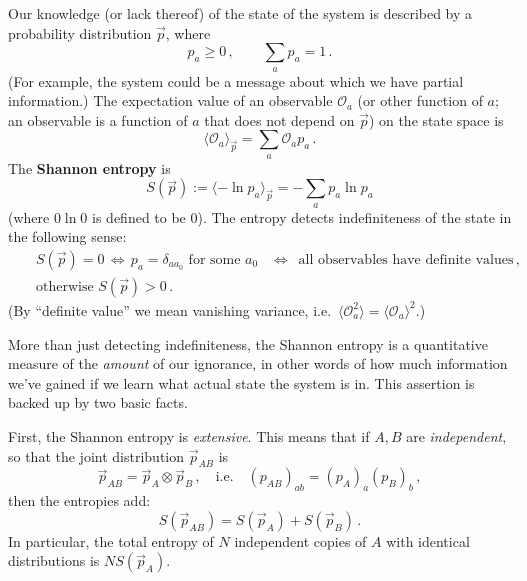 \documentclass[11pt]{article}
\newcommand{\ev}[1]{\langle{#1}\rangle}
\newcommand{\OO}{\mathcal{O}}
\begin{document}
Our knowledge (or lack thereof) of the state of the system is described by a probability distribution $\vec p$, where
\begin{equation}
p_a\ge0\,,\qquad\sum_ap_a = 1\,.
\end{equation}
(For example, the system could be a message about which we have partial information.) The expectation value of an observable $\OO_a$ (or other function of $a$; an observable is a function of $a$ that does not depend on $\vec p$) on the state space is
\begin{equation}
\ev{\OO_a}_{\vec p} = \sum_a\OO_ap_a\,.
\end{equation}
The \textbf{Shannon entropy} \cite{MR0026286} is
\begin{equation}
S(\vec p) := \ev{-\ln p_a}_{\vec p} = -\sum_ap_a\ln p_a
\end{equation}
(where $0\ln0$ is defined to be 0). The entropy detects indefiniteness of the state in the following sense:
\begin{eqnarray}\label{diagignorance}
&&S(\vec p) = 0 \,\Leftrightarrow\,p_a=\delta_{aa_0}\text{ for some $a_0$ }\,\Leftrightarrow\,\text{ all observables have definite values}\,, \nonumber \\
&&\text{otherwise }S(\vec p)>0\,.
\end{eqnarray}
(By ``definite value'' we mean vanishing variance, i.e.\ $\ev{\OO_a^2}=\ev{\OO_a}^2$.)

More than just detecting indefiniteness, the Shannon entropy is a quantitative measure of the \emph{amount} of our ignorance, in other words of how much information we've gained if we learn what actual state the system is in. This assertion is backed up by two basic facts.

First, the Shannon entropy is \emph{extensive}. This means that if $A,B$ are \emph{independent}, so that the joint distribution $\vec p_{AB}$ is 
\begin{equation}
\vec p_{AB} = \vec p_A\otimes\vec p_B\,,\quad
\text{i.e.}\quad(p_{AB})_{ab}=(p_A)_a(p_B)_b\,, 
\end{equation}
then the entropies add:
\begin{equation}
S(\vec p_{AB}) = S(\vec p_A)+S(\vec p_B)\,.
\end{equation}
In particular, the total entropy of $N$ independent copies of $A$ with identical distributions is $NS(\vec p_A)$.
\end{document}
